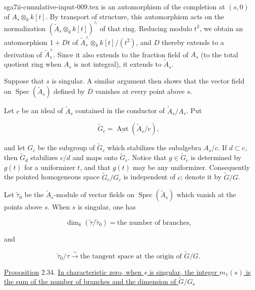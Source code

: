 \begin{filecontents*}{sga7ii-cumulative-input-009.tex}
is an automorphism of the completion at $(s,0)$ of
$A_s\otimes_k k[t]$.  By transport of structure, this automorphism acts on the
normalization $(\widetilde A_s\otimes_k k[t])^{\wedge}$ of that ring.  Reducing
modulo $t^2$, we obtain an automorphism $1+Dt$ of
$\widetilde A_s^{\wedge}\otimes_k k[t]/(t^2)$, and $D$ thereby extends to a
derivation of $\widetilde A_s^{\wedge}$.  Since it also extends to the fraction
field of $A_s$ (to the total quotient ring when $A_s$ is not integral), it
extends to $\widetilde A_s$.

Suppose that $s$ is singular.  A similar argument then shows that the vector
field on $\operatorname{Spec}(\widetilde A_s)$ defined by $D$ vanishes at every
point above $s$.

Let $c$ be an ideal of $\widetilde A_s$ contained in the conductor of
$\widetilde A_s/A_s$.  Put

\begin{equation*}
\widetilde G_c=\underline{\operatorname{Aut}}(\widetilde A_s/c),
\end{equation*}

and let $G_c$ be the subgroup of $\widetilde G_c$ which stabilizes the
subalgebra $A_s/c$.  If $d\subset c$, then $\widetilde G_d$ stabilizes $c/d$
and maps onto $\widetilde G_c$.  Notice that
$g\in\widetilde G_c$ is determined by $g(t)$ for a uniformizer $t$, and that
$g(t)$ may be any uniformizer.  Consequently the pointed homogeneous space
$\widetilde G_c/G_c$ is independent of $c$; denote it by $\widetilde G/G$.

Let $\widetilde\tau_0$ be the $\widetilde A_s$-module of vector fields on
$\operatorname{Spec}(\widetilde A_s)$ which vanish at the points above $s$.
When $s$ is singular, one has

\begin{equation*}
\dim_k(\widetilde\tau/\widetilde\tau_0)
=\text{the number of branches},
\end{equation*}

and

\begin{equation*}
\widetilde\tau_0/\tau\overset\sim\longrightarrow
\text{the tangent space at the origin of }\widetilde G/G.
\end{equation*}


\underline{Proposition} 2.34. \underline{In characteristic zero, when $s$ is
singular, the integer $m_1(s)$ is the sum of the number of branches and the
dimension of $\widetilde G/G$.}


\end{filecontents*}
